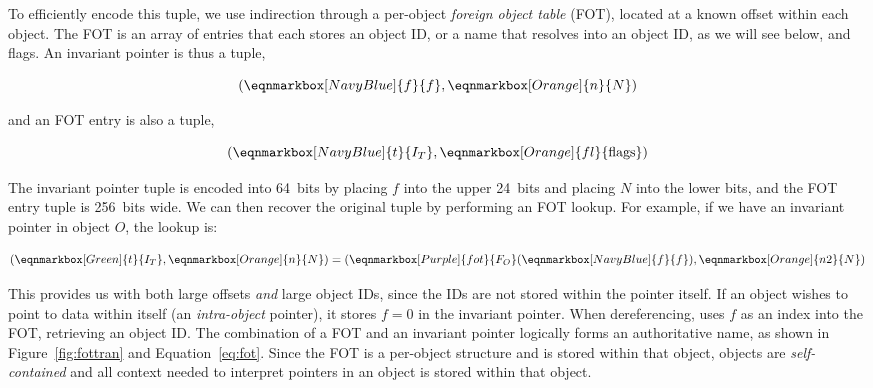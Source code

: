 To efficiently encode this tuple, we use indirection through a per-object \textit{foreign
    object table} (FOT), located at a known offset within each object. The FOT is an array of entries
that each stores an object ID, or a name that resolves into an object ID, as we will see
below, and flags. An invariant pointer is thus a tuple,

\vspace{3mm}

\begin{equation*}
    \left(
    \eqnmarkbox[NavyBlue]{f}{f}
    , \eqnmarkbox[Orange]{n}{N}\right)
\end{equation*}

\noindent and an FOT entry is also a tuple,

\begin{equation*}
    \left(
    \eqnmarkbox[NavyBlue]{t}{I_T},
    \eqnmarkbox[Orange]{fl}{\mathrm{flags}}
    \right)
\end{equation*}

The invariant pointer tuple is encoded into 64~bits by placing $f$ into the upper 24~bits and placing $N$ into the lower
bits, and the FOT entry tuple is 256~bits wide.
We can then recover the original tuple by performing an FOT lookup. For example, if we have an invariant pointer in
object $O$, the lookup is:

\begin{equation}\label{eq:fot}
    \left(
    \eqnmarkbox[Green]{t}{I_T}
    , \eqnmarkbox[Orange]{n}{N}\right) = \left(
    \eqnmarkbox[Purple]{fot}{F_O}(\eqnmarkbox[NavyBlue]{f}{f})
    , \eqnmarkbox[Orange]{n2}{N}
    \right)
\end{equation}
\vspace{0.4em}

This provides us
with both large offsets \emph{and} large object IDs, since the IDs are not stored within the pointer
itself.
If an object wishes to point to data within itself (an \emph{intra-object} pointer), it stores $f = 0$ in
the invariant pointer. When dereferencing, \Twizzler uses $f$
as an index into the FOT, retrieving an object ID\@.
The combination of a FOT and an invariant pointer logically forms
an authoritative name, as shown in Figure~\ref{fig:fottran} and Equation~\ref{eq:fot}. Since the FOT is a per-object structure and is stored
within that object, objects are \emph{self-contained} and all context needed to interpret pointers in an object is stored
within that object.

